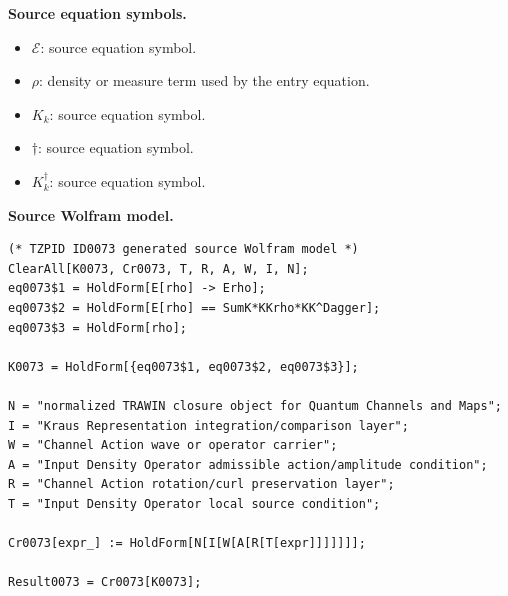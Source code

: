 \begin{minipage}[t]{0.49\linewidth}
\begingroup
\small
\raggedright
\textbf{Source equation symbols.}\par
\begin{itemize}[leftmargin=1.35em,itemsep=1pt,topsep=1pt,parsep=0pt]
    \item $\mathcal{E}$: source equation symbol.
    \item $\rho$: density or measure term used by the entry equation.
    \item $K_{k}$: source equation symbol.
    \item $\dagger$: source equation symbol.
    \item $K_{k}^{\dagger}$: source equation symbol.
\end{itemize}
\endgroup
\end{minipage}\hfill
\begin{minipage}[t]{0.47\linewidth}
\begingroup
\scriptsize
\raggedright
\textbf{Source Wolfram model.}\par
\begin{Verbatim}[fontsize=\tiny,breaklines=true,breakanywhere=true]
(* TZPID ID0073 generated source Wolfram model *)
ClearAll[K0073, Cr0073, T, R, A, W, I, N];
eq0073$1 = HoldForm[E[rho] -> Erho];
eq0073$2 = HoldForm[E[rho] == SumK*KKrho*KK^Dagger];
eq0073$3 = HoldForm[rho];

K0073 = HoldForm[{eq0073$1, eq0073$2, eq0073$3}];

N = "normalized TRAWIN closure object for Quantum Channels and Maps";
I = "Kraus Representation integration/comparison layer";
W = "Channel Action wave or operator carrier";
A = "Input Density Operator admissible action/amplitude condition";
R = "Channel Action rotation/curl preservation layer";
T = "Input Density Operator local source condition";

Cr0073[expr_] := HoldForm[N[I[W[A[R[T[expr]]]]]]];

Result0073 = Cr0073[K0073];
\end{Verbatim}
\endgroup
\end{minipage}

